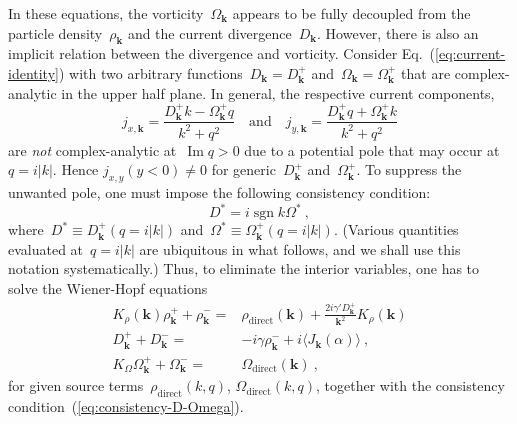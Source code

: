 \documentclass[preprint,aps,eqsecnum]{revtex4-1}
\newcommand{\fplus}[1]{{#1}^{+}}
\newcommand{\fminus}[1]{{#1}^{-}}
\renewcommand{\Im}{\mathop{\mathrm{Im}}\nolimits}
\newcommand{\sgn}{\mathop{\mathrm{sgn}}\nolimits}
\newcommand{\dct}[1]{{#1}_\mathrm{direct}}
\begin{document}
In these equations, the vorticity~$\Omega_{\bm k}$ appears to be fully
decoupled from the particle density~$\rho_{\bm k}$
and the current divergence~$D_{\bm k}$. However, there is also an implicit
relation between the divergence and vorticity. Consider
Eq.~(\ref{eq:current-identity}) with two arbitrary
functions~$D_{\bm k} = \fplus{D}_{\bm k}$
 and~$\Omega_{\bm k} = \fplus{\Omega}_{\bm k}$ that are complex-analytic
 in the upper half plane. In general, the respective current components,
\begin{equation}
\label{eq:jxy}
  j_{x, {\bm k}} = \frac{\fplus{D}_{\bm k} k - \fplus{\Omega}_{\bm k} q}{k^2 + q^2}
  \quad \mathrm{and}
  \quad
  j_{y, {\bm k}} = \frac{\fplus{D}_{\bm k} q  + \fplus{\Omega}_{\bm k} k}{k^2 + q^2}
\end{equation}
are \textit{not} complex-analytic at~$\Im q > 0$ due to a potential
pole that may occur at~$q = i |k|$. Hence $j_{x, y}(y < 0) \neq 0$
for generic~$\fplus{D}_{\bm k}$ and~$\fplus{\Omega}_{\bm k}$.
To suppress the unwanted pole, one must impose
the following consistency condition:
\begin{equation}
  \label{eq:consistency-D-Omega}
  D^\ast = i \sgn k \Omega^\ast
\ ,
\end{equation}
where~$D^\ast \equiv \fplus{D}_{\bm k} (q = i |k|)$
and~$\Omega^\ast \equiv \fplus{\Omega}_{\bm k} (q = i |k|)$.
(Various quantities evaluated at~$q = i |k|$ are ubiquitous in what follows,
and we shall use this notation systematically.)
Thus, to eliminate the interior variables,
one has to solve the Wiener-Hopf equations
\begin{align}
  \label{eq:wh-rho-3}
  K_\rho({\bm k}) \fplus{\rho}_{\bm k} + \fminus{\rho}_{\bm k}
  ={}& \dct{\rho}({\bm k}) + \frac{2 i \gamma' \fplus{D}_{\bm k}}{{\bm k}^2}
   K_\rho({\bm k})
  \\
  \label{eq:wh-D-3}
  \fplus{D}_{\bm k} + \fminus{D}_{\bm k}
  ={}& -i \gamma \fminus{\rho}_{\bm k} + i \langle J_{\bm k}(\alpha) \rangle \ ,
  \\
  \label{eq:wh-Omega-3}
  K_\Omega\fplus{\Omega}_{\bm k} + \fminus{\Omega}_{\bm k}
  ={}& \dct{\Omega}({\bm k})
  \ ,
\end{align}
for given source terms~$\dct{\rho}(k, q)$, $\dct{\Omega}(k, q)$,
together with the consistency condition~(\ref{eq:consistency-D-Omega}).
\end{document}
